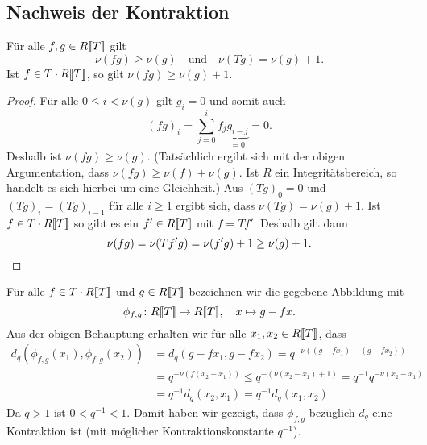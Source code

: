 \documentclass[a4paper, 10pt, numbers=noenddot]{scrartcl}
\begin{document}
\section{}


\subsection*{Nachweis der Kontraktion}


\begin{claim}
  Für alle $f, g \in R[\![T]\!]$ gilt
  \[
    \nu(f g) \geq \nu(g)
    \quad\text{und}\quad
    \nu(T g) = \nu(g) + 1.
  \]
  Ist $f \in T \cdot R[\![T]\!]$, so gilt $\nu(f g) \geq \nu(g) + 1$.
\end{claim}
\begin{proof}
  Für alle $0 \leq i < \nu(g)$ gilt $g_i = 0$ und somit auch
  \[
      (f g)_i
    = \sum_{j=0}^i f_j \underbrace{g_{i-j}}_{=0}
    = 0.
  \]
  Deshalb ist $\nu(f g) \geq \nu(g)$.  
  (Tatsächlich ergibt sich mit der obigen Argumentation, dass $\nu(fg) \geq \nu(f) + \nu(g)$.
  Ist $R$ ein Integritätsbereich, so handelt es sich hierbei um eine Gleichheit.)
  Aus $(T g)_0 = 0$ und $(T g)_i = (T g)_{i-1}$ für alle $i \geq 1$ ergibt sich, dass $\nu(T g) = \nu(g) + 1$.
  Ist $f \in T \cdot R[\![T]\!]$ so gibt es ein $f' \in R[\![T]\!]$ mit $f = T f'$.
  Deshalb gilt dann
  \[
          \nu(f g)
    =     \nu(T f' g)
    =     \nu(f' g) + 1
    \geq  \nu(g) + 1.
    \qedhere
  \]
\end{proof}

Für alle $f \in T \cdot R[\![T]\!]$ und $g \in R[\![T]\!]$ bezeichnen wir die gegebene Abbildung mit
\[
  \phi_{f,g} \colon R[\![T]\!] \to R[\![T]\!],
  \quad
  x \mapsto g - fx.
\]
Aus der obigen Behauptung erhalten wir für alle $x_1, x_2 \in R[\![T]\!]$, dass
\begin{align*}
        d_q( \phi_{f,g}(x_1), \phi_{f,g}(x_2) )
  &=    d_q(g - f x_1, g - f x_2)
   =    q^{-\nu((g - f x_1) - (g - f x_2))}
  \\
  &=    q^{-\nu(f (x_2 - x_1))}
  \leq  q^{-(\nu(x_2 - x_1) + 1)}
  =     q^{-1} q^{-\nu(x_2 - x_1)}
  \\
  &=    q^{-1} d_q(x_2, x_1)
  =     q^{-1} d_q(x_1, x_2).
\end{align*}
Da $q > 1$ ist $0 < q^{-1} < 1$.
Damit haben wir gezeigt, dass $\phi_{f,g}$ bezüglich $d_q$ eine Kontraktion ist (mit möglicher Kontraktionskonstante $q^{-1}$).
\end{document}
